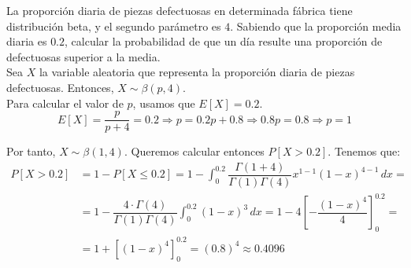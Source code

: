 \begin{ejercicio}
    La proporción diaria de piezas defectuosas en determinada fábrica tiene distribución beta, y el segundo parámetro es $4$. Sabiendo que la proporción media diaria es $0.2$, calcular la probabilidad de que un día resulte una proporción de defectuosas superior a la media.\\

    Sea $X$ la variable aleatoria que representa la proporción diaria de piezas defectuosas. Entonces, $X\sim \beta(p,4)$.\\
    
    Para calcular el valor de $p$, usamos que $E[X] = 0.2$.
    \begin{equation*}
        E[X] = \dfrac{p}{p+4} = 0.2 \Longrightarrow p = 0.2p+0.8 \Longrightarrow 0.8p = 0.8 \Longrightarrow p = 1
    \end{equation*}

    Por tanto, $X\sim \beta(1,4)$. Queremos calcular entonces $P[X>0.2]$. Tenemos que:
    \begin{align*}
        P[X>0.2] &= 1-P[X\leq 0.2] = 1-\int_{0}^{0.2} \dfrac{\Gamma(1+4)}{\Gamma(1)\Gamma(4)} x^{1-1} (1-x)^{4-1} \, dx =\\&= 1-\dfrac{4\cdot \Gamma(4)}{\Gamma(1)\Gamma(4)} \int_{0}^{0.2} (1-x)^{3} \, dx = 1-4\left[-\dfrac{(1-x)^4}{4}\right]_{0}^{0.2} =\\
        &= 1+\left[(1-x)^4\right]_{0}^{0.2} = (0.8)^4 \approx 0.4096
    \end{align*}
    


\end{ejercicio}

